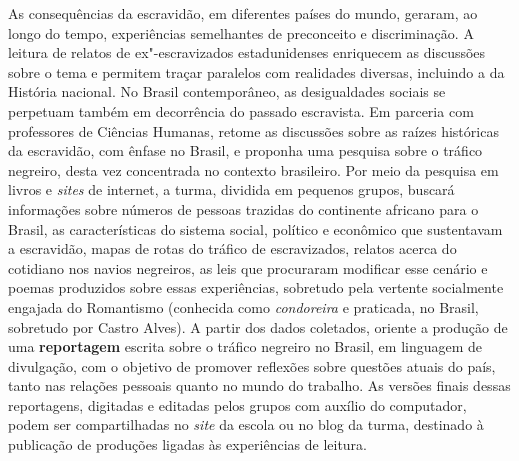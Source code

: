 \documentclass[11pt]{extarticle}
\begin{document}
\begin{enumerate}
\begin{enumerate}
\begin{enumerate}
  As consequências da escravidão, em diferentes países do mundo,
  geraram, ao longo do tempo, experiências semelhantes de preconceito e
  discriminação. A leitura de relatos de ex"-escravizados estadunidenses
  enriquecem as discussões sobre o tema e permitem traçar paralelos com
  realidades diversas, incluindo a da História nacional. No Brasil
  contemporâneo, as desigualdades sociais se perpetuam também em
  decorrência do passado escravista. Em parceria com professores de
  Ciências Humanas, retome as discussões sobre as raízes históricas da
  escravidão, com ênfase no Brasil, e proponha uma pesquisa sobre o
  tráfico negreiro, desta vez concentrada no contexto brasileiro. Por
  meio da pesquisa em livros e \emph{sites} de internet, a turma,
  dividida em pequenos grupos, buscará informações sobre números de
  pessoas trazidas do continente africano para o Brasil, as
  características do sistema social, político e econômico que
  sustentavam a escravidão, mapas de rotas do tráfico de escravizados,
  relatos acerca do cotidiano nos navios negreiros, as leis que
  procuraram modificar esse cenário e poemas produzidos sobre essas
  experiências, sobretudo pela vertente socialmente engajada do
  Romantismo (conhecida como \emph{condoreira} e praticada, no Brasil,
  sobretudo por Castro Alves). A partir dos dados coletados, oriente a
  produção de uma \textbf{reportagem} escrita sobre o tráfico negreiro
  no Brasil, em linguagem de divulgação, com o objetivo de promover
  reflexões sobre questões atuais do país, tanto nas relações pessoais
  quanto no mundo do trabalho. As versões finais dessas reportagens,
  digitadas e editadas pelos grupos com auxílio do computador, podem ser
  compartilhadas no \emph{site} da escola ou no blog da turma, destinado
  à publicação de produções ligadas às experiências de leitura.
\begin{comment}
\section{Referências complementares}

\subsection{Livros}

\begin{itemize}
\item\textsc{adichie}, Chimamanda Ngozi. \textbf{Americanah}. São Paulo: Companhia
  das Letras, 2014.


\end{comment}
\end{enumerate}
\end{enumerate}
\end{enumerate}
\end{document}

